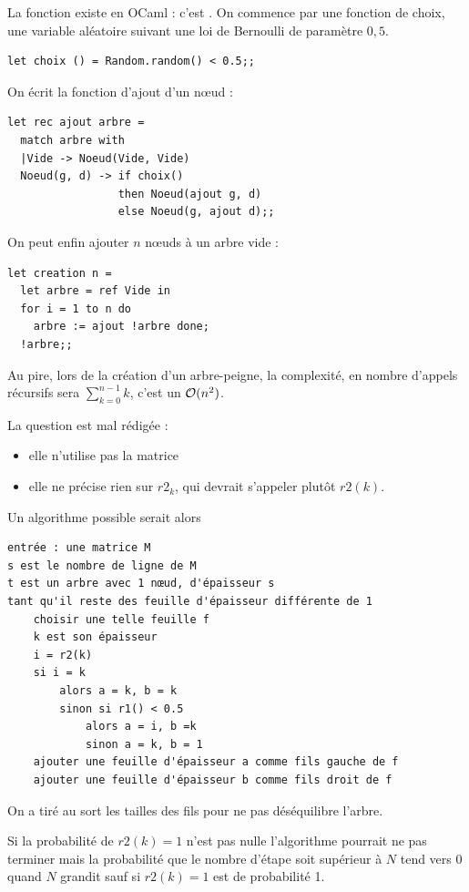 \begin{Exercise}
La fonction existe en OCaml : c'est .
On commence par une fonction de choix, une variable aléatoire suivant une loi de Bernoulli de paramètre $0,5$.
\begin{lstlisting}
let choix () = Random.random() < 0.5;;
\end{lstlisting}

On écrit la fonction d'ajout d'un n{\oe}ud : 
\begin{lstlisting}
let rec ajout arbre = 
  match arbre with
  |Vide -> Noeud(Vide, Vide)
  Noeud(g, d) -> if choix()
                 then Noeud(ajout g, d)
                 else Noeud(g, ajout d);;
\end{lstlisting}

\newpage

On peut enfin ajouter $n$ n{\oe}uds à un arbre vide :
\begin{lstlisting}
let creation n = 
  let arbre = ref Vide in
  for i = 1 to n do
    arbre := ajout !arbre done;
  !arbre;;
\end{lstlisting}
Au pire, lors de la création d'un arbre-peigne, la complexité, en nombre d'appels récursifs sera $\displaystyle \sum_{k=0}^{n-1} k$, c'est un ${\cal O}(n^2)$.
\end{Exercise}
\begin{Exercise}La question est mal rédigée :
\begin{itemize}
    \item elle n'utilise pas la matrice
    \item elle ne précise rien sur $r2_k$, qui devrait s'appeler plutôt $r2(k)$.
\end{itemize}

Un algorithme possible serait alors
\begin{lstlisting}
entrée : une matrice M
s est le nombre de ligne de M
t est un arbre avec 1 nœud, d'épaisseur s
tant qu'il reste des feuille d'épaisseur différente de 1
    choisir une telle feuille f
    k est son épaisseur
    i = r2(k)
    si i = k
        alors a = k, b = k
        sinon si r1() < 0.5
            alors a = i, b =k
            sinon a = k, b = 1
    ajouter une feuille d'épaisseur a comme fils gauche de f        
    ajouter une feuille d'épaisseur b comme fils droit de f        
\end{lstlisting}
 On a tiré au sort les tailles des fils pour ne pas déséquilibre l'arbre.
 
Si la probabilité de $r2(k)=1$ n'est pas nulle l'algorithme pourrait ne pas terminer mais la probabilité que le nombre d'étape soit supérieur à $N$ tend vers 0 quand $N$ grandit sauf si $r2(k)=1$ est de probabilité 1.
\end{Exercise}
